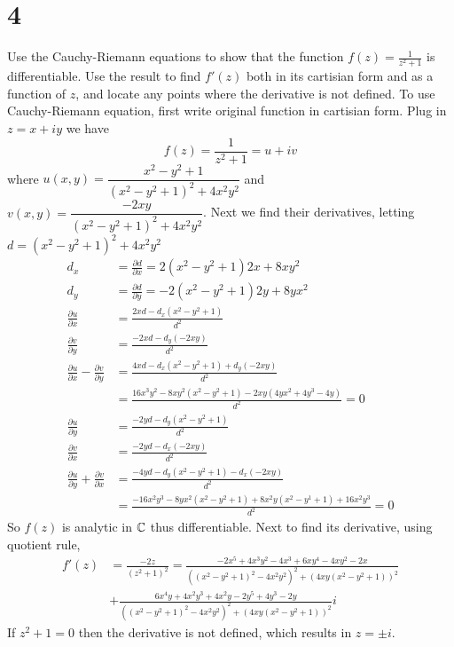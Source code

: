 \documentclass{article}
\begin{document}
\section*{4}
\begin{myleftlinebox}
    Use the Cauchy-Riemann equations to show that the function \(f(z)=\frac{1}{z^2+1}\) is differentiable. Use the result to find \(f'(z)\) both in its cartisian form and as a function of \(z\), and locate any points where the derivative is not defined.
    \tcbline
    To use Cauchy-Riemann equation, first write original function in cartisian form. Plug in \(z=x+iy\) we have
    \[f(z)=\frac{1}{z^2+1}=u+iv\]
    where \(u(x,y)=\dfrac{x^2-y^2+1}{(x^2-y^2+1)^2+4x^2y^2}\) and \(v(x,y)=\dfrac{-2xy}{(x^2-y^2+1)^2+4x^2y^2}\). Next we find their derivatives, letting \(d=(x^2-y^2+1)^2+4x^2y^2\)
    \begin{align*}
        d_x &= \frac{\partial d}{\partial x} = 2(x^2-y^2+1)2x+8xy^2\\
        d_y &= \frac{\partial d}{\partial y} = -2(x^2-y^2+1)2y+8yx^2\\
        \frac{\partial u}{\partial x} &= \frac{2xd-d_x (x^2-y^2+1)}{d^2}\\
        \frac{\partial v}{\partial y} &= \frac{-2xd-d_y(-2xy)}{d^2} \\
        \frac{\partial u}{\partial x}-\frac{\partial v}{\partial y} &= \frac{4xd-d_x (x^2-y^2+1)+d_y(-2xy)}{d^2}\\
        &= \frac{16x^3y^2-8xy^2(x^2-y^2+1)-2xy(4yx^2+4y^3-4y)}{d^2}=0\\
        \frac{\partial u}{\partial y} &= \frac{-2yd-d_y(x^2-y^2+1)}{d^2}\\
        \frac{\partial v}{\partial x} &= \frac{-2yd-d_x(-2xy)}{d^2}\\
        \frac{\partial u}{\partial y}+\frac{\partial v}{\partial x} &= \frac{-4yd-d_y(x^2-y^2+1)-d_x(-2xy)}{d^2}\\
         &= \frac{-16x^2y^3-8yx^2(x^2-y^2+1)+8x^2y(x^2-y^1+1)+16x^2y^3}{d^2}=0
    \end{align*}
    So \(f(z)\) is analytic in \(\mathbb{C}\) thus differentiable. Next to find its derivative, using quotient rule, 
    \begin{align*}
        f'(z) &= \frac{-2z}{(z^2+1)^2}=\frac{-2x^5+4x^3y^2-4x^3+6xy^4-4xy^2-2x}{((x^2-y^2+1)^2-4x^2y^2)^2+(4xy(x^2-y^2+1))^2}\\
        &+ \frac{6x^4y+4x^2y^3+4x^2y-2y^5+4y^3-2y}{((x^2-y^2+1)^2-4x^2y^2)^2+(4xy(x^2-y^2+1))^2}i
    \end{align*}
    If \(z^2+1=0\) then the derivative is not defined, which results in \(z=\pm i\).
\end{myleftlinebox}
\end{document}
